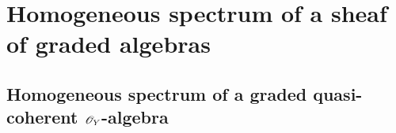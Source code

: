 \section{Homogeneous spectrum of a sheaf of graded algebras}
\label{section:2.3}


\subsection{Homogeneous spectrum of a graded quasi-coherent $\mathscr{O}_Y$-algebra}
\label{subsection:2.3.1}














